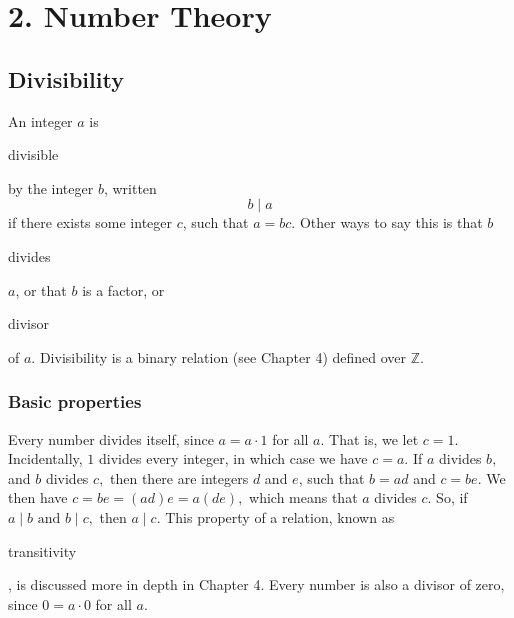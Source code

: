 \documentclass[11pt]{article}
\theoremstyle{plain}
\theoremstyle{definition}
\begin{document}
\section*{2. Number Theory}

\subsection*{Divisibility}

An integer $a$ is \begin{em}divisible\end{em} by the integer $b$, written
$$b \mid a$$
if there exists some integer $c$, such that $ a = bc. $ Other ways to say this is that $b$ \begin{em}divides\end{em} $a$, or that $b$ is a factor, or \begin{em}divisor\end{em} of $a$. Divisibility is a binary relation (see Chapter 4) defined over $\mathbb{Z}$.

\subsubsection*{Basic properties}


Every number divides itself, since $a = a \cdot 1$ for all $a$. That is, we let $c = 1.$ Incidentally, $1$ divides every integer, in which case we have $c = a$. If $a$ divides $b,$ and $b$ divides $c,$ then there are integers $d$ and $e$, such that $b = ad$ and $c = be$. We then have $c = be = (ad)e = a(de),$ which means that $a$ divides $c.$ So, if $a \mid b \text{ and } b \mid c,$ then $a \mid c.$ This property of a relation, known as \begin{em}transitivity\end{em}, is discussed more in depth in Chapter 4. Every number is also a divisor of zero, since $0 = a \cdot 0$ for all $a$.

%




\end{document}
